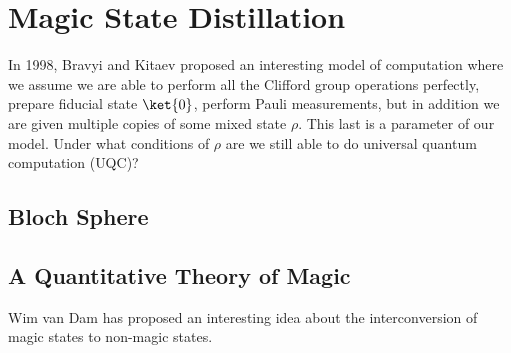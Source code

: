 \section{Magic State Distillation}

In 1998, Bravyi and Kitaev proposed an interesting model of computation where
we assume we are able to perform all the Clifford group operations perfectly,
prepare fiducial state $\ket{0}$, perform Pauli measurements, but in
addition we are given multiple copies of some mixed state $\rho$. This last
is a parameter of our model. Under what conditions of $\rho$ are we still
able to do universal quantum computation (\textsc{UQC})?

\subsection{Bloch Sphere}

\subsection{A Quantitative Theory of Magic}

Wim van Dam has proposed an interesting idea about the interconversion of
magic states to non-magic states.